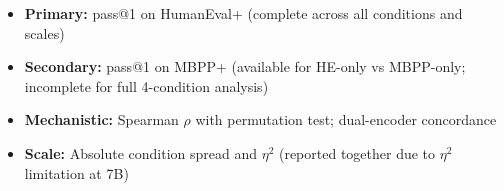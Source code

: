 \begin{itemize}
\item \textbf{Primary:} pass@1 on HumanEval+ (complete across all conditions and scales)
\item \textbf{Secondary:} pass@1 on MBPP+ (available for HE-only vs MBPP-only; incomplete for full 4-condition analysis)
\item \textbf{Mechanistic:} Spearman $\rho$ with permutation test; dual-encoder concordance
\item \textbf{Scale:} Absolute condition spread and $\eta^2$ (reported together due to $\eta^2$ limitation at 7B)
\end{itemize}
